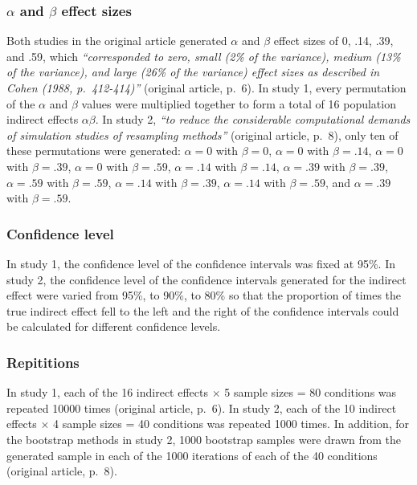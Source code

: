 \documentclass[10,a4paperpaper,]{article}
\begin{document}
\subsubsection{$\alpha$ and $\beta$ effect sizes}

Both studies in the original article generated \(\alpha\) and \(\beta\)
effect sizes of 0, .14, .39, and .59, which \emph{``corresponded to
zero, small (2\% of the variance), medium (13\% of the variance), and
large (26\% of the variance) effect sizes as described in Cohen (1988,
p.~412-414)''} (original article, p.~6). In study 1, every permutation
of the \(\alpha\) and \(\beta\) values were multiplied together to form
a total of 16 population indirect effects \(\alpha \beta\). In study 2,
\emph{``to reduce the considerable computational demands of simulation
studies of resampling methods''} (original article, p.~8), only ten of
these permutations were generated: \(\alpha = 0\) with \(\beta = 0\),
\(\alpha = 0\) with \(\beta = .14\), \(\alpha = 0\) with
\(\beta = .39\), \(\alpha = 0\) with \(\beta = .59\), \(\alpha = .14\)
with \(\beta = .14\), \(\alpha = .39\) with \(\beta = .39\),
\(\alpha = .59\) with \(\beta = .59\), \(\alpha = .14\) with
\(\beta = .39\), \(\alpha = .14\) with \(\beta = .59\), and
\(\alpha = .39\) with \(\beta = .59\).

\subsubsection{Confidence level}

In study 1, the confidence level of the confidence intervals was fixed
at 95\%. In study 2, the confidence level of the confidence intervals
generated for the indirect effect were varied from 95\%, to 90\%, to
80\% so that the proportion of times the true indirect effect fell to
the left and the right of the confidence intervals could be calculated
for different confidence levels.

\subsubsection{Repititions}

In study 1, each of the 16 indirect effects \(\times\) 5 sample sizes =
80 conditions was repeated 10000 times (original article, p.~6). In
study 2, each of the 10 indirect effects \(\times\) 4 sample sizes = 40
conditions was repeated 1000 times. In addition, for the bootstrap
methods in study 2, 1000 bootstrap samples were drawn from the generated
sample in each of the 1000 iterations of each of the 40 conditions
(original article, p.~8).
\end{document}
